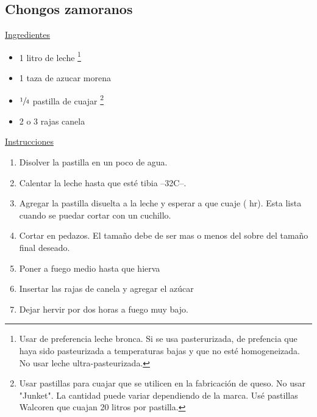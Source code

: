 \subsection{Chongos zamoranos}

\underline{Ingredientes}

\begin{itemize}
\item 1 litro de leche \footnote{Usar de preferencia leche bronca. Si se usa pasterurizada, de prefencia que haya sido pasteurizada a temperaturas bajas y que no esté homogeneizada. No usar leche ultra-pasteurizada.}
\item 1 taza de azucar morena
\item $\sfrac{1}{4}$ pastilla de cuajar \footnote{Usar pastillas para cuajar que se utilicen en la fabricación de queso. No usar "Junket". La cantidad puede variar dependiendo de la marca. Usé pastillas Walcoren que cuajan 20 litros por pastilla.}
\item 2 o 3 rajas canela
\end{itemize}

\underline{Instrucciones}
\begin{enumerate}
\item Disolver la pastilla en un poco de agua.
\item Calentar la leche hasta que esté tibia --\Sim 32C--.
\item Agregar la pastilla disuelta a la leche y esperar a que cuaje ( hr). Esta lista cuando se puedar cortar con un cuchillo.
\item Cortar en  pedazos. El tamaño debe de ser mas o menos del sobre del tamaño final deseado.
\item Poner a fuego medio hasta que hierva
\item Insertar las rajas de canela y agregar el azúcar
\item Dejar hervir por dos horas a fuego muy bajo.
\end{enumerate}